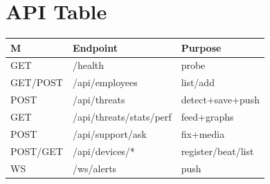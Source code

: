 \documentclass[11pt,a4paper]{article}
\begin{document}
\section{API Table}
\begin{table}[h]\centering\begin{tabular}{@{}lll@{}} \toprule M & Endpoint & Purpose\\\midrule GET & /health & probe\\ GET/POST & /api/employees & list/add\\ POST & /api/threats & detect+save+push\\ GET & /api/threats/stats/perf & feed+graphs\\ POST & /api/support/ask & fix+media\\ POST/GET & /api/devices/* & register/beat/list\\ WS & /ws/alerts & push\\\bottomrule\end{tabular}\end{table}
\end{document}
